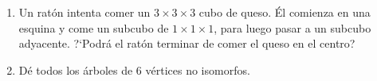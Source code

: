 \documentclass[12pt,spanish,makeidx]{amsbook}
\theoremstyle{definition}
\theoremstyle{remark}
\begin{document}
\begin{enumerate}
\medskip

\item Un ratón intenta comer un $3\times 3\times 3$ cubo de queso. Él comienza en una
esquina y come un subcubo de $1\times 1\times 1$, para luego pasar
a un subcubo adyacente. ?`Podrá el ratón terminar de comer el
queso en el centro?


\item Dé todos los árboles de 6 vértices no isomorfos.



\end{enumerate}
\end{document}
